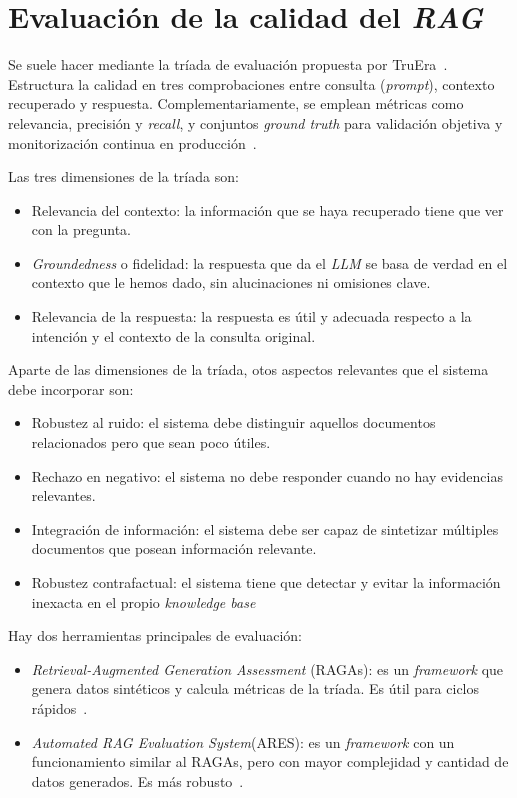 \section{Evaluación de la calidad del \textit{RAG}}
Se suele hacer mediante la tríada de evaluación propuesta por TruEra~\cite{RAG:triad}. Estructura la calidad en tres comprobaciones entre consulta (\textit{prompt}), contexto recuperado y respuesta. Complementariamente, se emplean métricas como relevancia, precisión y \textit{recall}, y conjuntos \textit{ground truth} para validación objetiva y monitorización continua en producción~\cite{book:RAG_SimpleGuide}.

Las tres dimensiones de la tríada son:
\begin{itemize}
\tightlist
	\item Relevancia del contexto: la información que se haya recuperado tiene que ver con la pregunta.
	\item \textit{Groundedness} o fidelidad: la respuesta que da el \textit{LLM} se basa de verdad en el contexto que le hemos dado, sin alucinaciones ni omisiones clave.
	\item Relevancia de la respuesta: la respuesta es útil y adecuada respecto a la intención y el contexto de la consulta original.
\end{itemize}

Aparte de las dimensiones de la tríada, otos aspectos relevantes que el sistema debe incorporar son:
\begin{itemize}
\tightlist
	\item Robustez al ruido: el sistema debe distinguir aquellos documentos relacionados pero que sean poco útiles.
	\item Rechazo en negativo: el sistema no debe responder cuando no hay evidencias relevantes.
	\item Integración de información: el sistema debe ser capaz de sintetizar múltiples documentos que posean información relevante.
	\item Robustez contrafactual: el sistema tiene que detectar y evitar la información inexacta en el propio \textit{knowledge base}
\end{itemize}

Hay dos herramientas principales de evaluación:
\begin{itemize}
\tightlist
	\item \textit{Retrieval-Augmented Generation Assessment} (RAGAs): es un \textit{framework} que genera datos sintéticos y calcula métricas de la tríada. Es útil para ciclos rápidos~\cite{ragas:docs}. 
	\item \textit{Automated RAG Evaluation System}(ARES): es un \textit{framework} con un funcionamiento similar al RAGAs, pero con mayor complejidad y cantidad de datos generados. Es más robusto~\cite{saadfalcon2023ares}.
\end{itemize}
